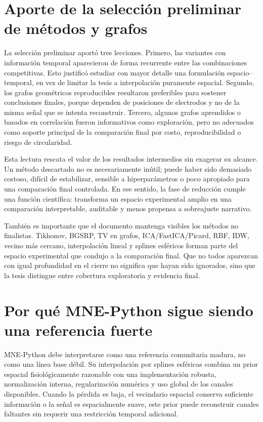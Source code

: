 \section{Aporte de la selección preliminar de métodos y grafos}

La selección preliminar aportó tres lecciones. Primero, las variantes con información temporal aparecieron de forma recurrente entre las combinaciones competitivas. Esto justificó estudiar con mayor detalle una formulación espacio--temporal, en vez de limitar la tesis a interpolación puramente espacial. Segundo, los grafos geométricos reproducibles resultaron preferibles para sostener conclusiones finales, porque dependen de posiciones de electrodos y no de la misma señal que se intenta reconstruir. Tercero, algunos grafos aprendidos o basados en correlación fueron informativos como exploración, pero no adecuados como soporte principal de la comparación final por costo, reproducibilidad o riesgo de circularidad.

Esta lectura rescata el valor de los resultados intermedios sin exagerar su alcance. Un método descartado no es necesariamente inútil; puede haber sido demasiado costoso, difícil de estabilizar, sensible a hiperparámetros o poco apropiado para una comparación final controlada. En ese sentido, la fase de reducción cumple una función científica: transforma un espacio experimental amplio en una comparación interpretable, auditable y menos propensa a sobreajuste narrativo.

También es importante que el documento mantenga visibles los métodos no finalistas. Tikhonov, BGSRP, TV en grafos, ICA/FastICA/Picard, RBF, IDW, vecino más cercano, interpolación lineal y splines esféricos forman parte del espacio experimental que condujo a la comparación final. Que no todos aparezcan con igual profundidad en el cierre no significa que hayan sido ignorados, sino que la tesis distingue entre cobertura exploratoria y evidencia final.

\section{Por qué MNE-Python sigue siendo una referencia fuerte}

MNE-Python debe interpretarse como una referencia comunitaria madura, no como una línea base débil. Su interpolación por splines esféricas combina un prior espacial fisiológicamente razonable con una implementación robusta, normalización interna, regularización numérica y uso global de los canales disponibles. Cuando la pérdida es baja, el vecindario espacial conserva suficiente información o la señal es espacialmente suave, este prior puede reconstruir canales faltantes sin requerir una restricción temporal adicional.

